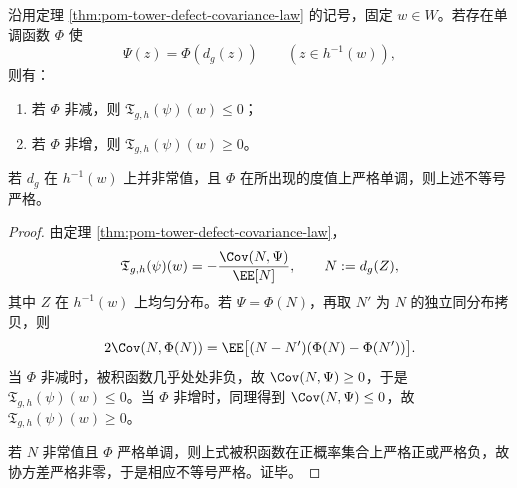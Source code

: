 \begin{theorem}\label{thm:conclusion-pom-size-bias-monotonicity}
沿用定理 \ref{thm:pom-tower-defect-covariance-law} 的记号，固定 \(w\in W\)。若存在单调函数 \(\Phi\) 使
\[
\Psi(z)=\Phi(d_g(z))
\qquad (z\in h^{-1}(w)),
\]
则有：
\begin{enumerate}
  \item 若 \(\Phi\) 非减，则 \(\mathfrak T_{g,h}(\psi)(w)\le 0\)；
  \item 若 \(\Phi\) 非增，则 \(\mathfrak T_{g,h}(\psi)(w)\ge 0\)。
\end{enumerate}
若 \(d_g\) 在 \(h^{-1}(w)\) 上并非常值，且 \(\Phi\) 在所出现的度值上严格单调，则上述不等号严格。
\end{theorem}
\begin{proof}
由定理 \ref{thm:pom-tower-defect-covariance-law}，
\[
\mathfrak T_{g,h}(\psi)(w)=-\frac{\Cov(N,\Psi)}{\EE[N]},
\qquad
N:=d_g(Z),
\]
其中 \(Z\) 在 \(h^{-1}(w)\) 上均匀分布。若 \(\Psi=\Phi(N)\)，再取 \(N'\) 为 \(N\) 的独立同分布拷贝，则
\[
2\Cov(N,\Phi(N))
=
\EE\bigl[(N-N')(\Phi(N)-\Phi(N'))\bigr].
\]
当 \(\Phi\) 非减时，被积函数几乎处处非负，故 \(\Cov(N,\Psi)\ge 0\)，于是 \(\mathfrak T_{g,h}(\psi)(w)\le 0\)。当 \(\Phi\) 非增时，同理得到 \(\Cov(N,\Psi)\le 0\)，故 \(\mathfrak T_{g,h}(\psi)(w)\ge 0\)。

若 \(N\) 非常值且 \(\Phi\) 严格单调，则上式被积函数在正概率集合上严格正或严格负，故协方差严格非零，于是相应不等号严格。证毕。
\end{proof}

